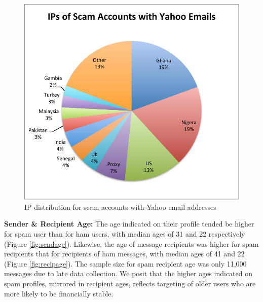 \documentclass[preprint]{acm_proc_article-sp}
\begin{document}
\begin{figure}[h]
    \centering
    \includegraphics[width=\linewidth]{figures/yahoo-spam.pdf}
    \caption{IP distribution for scam accounts with Yahoo email addresses}
    \label{fig:yspam}
\end{figure}

\textbf{Sender \& Recipient Age:} The age indicated on their profile tended be higher for spam user than 
for ham users, with median ages of 31 and 22 respectively (Figure \ref{fig:sendage}). Likewise, the 
age of message recipients was higher for spam recipients that for recipients of ham messages, with 
median ages of 41 and 22 (Figure \ref{fig:recipage}). The sample size for spam recipient age 
was only 11,000 messages due to late data collection. We posit that the higher ages indicated on spam profiles, 
mirrored in recipient ages, reflects targeting of older users who are more likely to be financially 
stable. 
\end{document}
